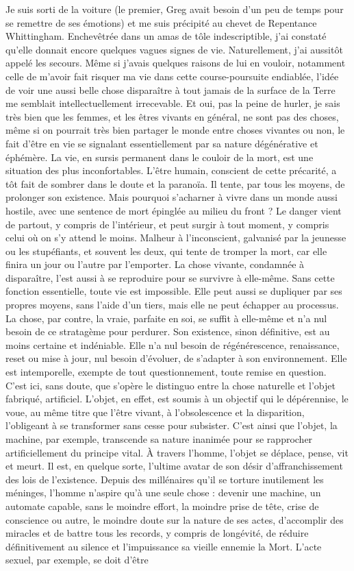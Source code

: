 Je suis sorti de la voiture (le premier, Greg avait besoin d’un peu de temps pour se remettre de ses émotions) et me suis précipité au chevet de Repentance Whittingham. Enchevêtrée dans un amas de tôle indescriptible, j’ai constaté qu’elle donnait encore quelques vagues signes de vie. Naturellement, j’ai aussitôt appelé les secours. Même si j’avais quelques raisons de lui en vouloir, notamment celle de m’avoir fait risquer ma vie dans cette course-poursuite endiablée, l’idée de voir une aussi belle chose disparaître à tout jamais de la surface de la Terre me semblait intellectuellement irrecevable. Et oui, pas la peine de hurler, je sais très bien que les femmes, et les êtres vivants en général, ne sont pas des choses, même si on pourrait très bien partager le monde entre choses vivantes ou non, le fait d’être en vie se signalant essentiellement par sa nature dégénérative et éphémère. La vie, en sursis permanent dans le couloir de la mort, est une situation des plus inconfortables. L’être humain, conscient de cette précarité, a tôt fait de sombrer dans le doute et la paranoïa. Il tente, par tous les moyens, de prolonger son existence. Mais pourquoi s’acharner à vivre dans un monde aussi hostile, avec une sentence de mort épinglée au milieu du front ? Le danger vient de partout, y compris de l’intérieur, et peut surgir à tout moment, y compris celui où on s’y attend le moins. Malheur à l’inconscient, galvanisé par la jeunesse ou les stupéfiants, et souvent les deux, qui tente de tromper la mort, car elle finira un jour ou l’autre par l’emporter. La chose vivante, condamnée à disparaître, l’est aussi à se reproduire pour se survivre à elle-même. Sans cette fonction essentielle, toute vie est impossible. Elle peut aussi se dupliquer par ses propres moyens, sans l’aide d’un tiers, mais elle ne peut échapper au processus. La chose, par contre, la vraie, parfaite en soi, se suffit à elle-même et n’a nul besoin de ce stratagème pour perdurer. Son existence, sinon définitive, est au moins certaine et indéniable. Elle n’a nul besoin de régénérescence, renaissance, reset ou mise à jour, nul besoin d’évoluer, de s’adapter à son environnement. Elle est intemporelle, exempte de tout questionnement, toute remise en question. C’est ici, sans doute, que s’opère le distinguo entre la chose naturelle et l’objet fabriqué, artificiel. L’objet, en effet, est soumis à un objectif qui le dépérennise, le voue, au même titre que l’être vivant, à l’obsolescence et la disparition, l’obligeant à se transformer sans cesse pour subsister. C’est ainsi que l’objet, la machine, par exemple, transcende sa nature inanimée pour se rapprocher artificiellement du principe vital. À travers l’homme, l’objet se déplace, pense, vit et meurt. Il est, en quelque sorte, l’ultime avatar de son désir d’affranchissement des lois de l’existence. Depuis des millénaires qu’il se torture inutilement les méninges, l’homme n’aspire qu’à une seule chose : devenir une machine, un automate capable, sans le moindre effort, la moindre prise de tête, crise de conscience ou autre, le moindre doute sur la nature de ses actes, d’accomplir des miracles et de battre tous les records, y compris de longévité, de réduire définitivement au silence et l’impuissance sa vieille ennemie la Mort. L’acte sexuel, par exemple, se doit d’être 